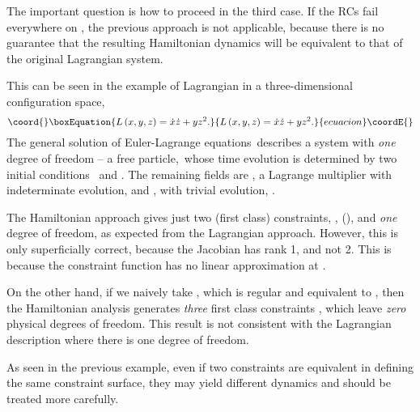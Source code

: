 \documentclass[a4paper,thmsa,11pt]{article}
\begin{document}
The important question is how to proceed in the third case. If the RCs fail
everywhere on \myHighlight{$\Sigma $}\coordHE{}, the previous approach is not applicable, because
there is no guarantee that the resulting Hamiltonian dynamics will be
equivalent to that of the original Lagrangian system.

This can be seen in the example of Lagrangian in a three-dimensional
configuration space,
\begin{equation}\coord{}\boxEquation{
L\left( x,y,z\right) =\dot{x}\dot{z}+yz^{2}.  \label{three particles}
}{
L\left( x,y,z\right) =\dot{x}\dot{z}+yz^{2}.  }{ecuacion}\coordE{}\end{equation}
The general solution of Euler-Lagrange equations\ describes a system with
\emph{one} degree of freedom -- a free particle,\ whose time evolution \coordHE{} is determined by two initial conditions \coordHE{}\ and \coordHE{}. The remaining fields are \coordHE{}, a Lagrange multiplier with
indeterminate evolution, and \coordHE{}, with trivial evolution, \coordHE{}.

The Hamiltonian approach gives just two (first class) constraints, \coordHE{},\coordHE{} (\coordHE{}), and \emph{one} degree of
freedom, as expected from the Lagrangian approach. However, this is only
superficially correct, because the Jacobian has rank 1, and not 2. This is
because the constraint function \myHighlight{$\phi =z^{2}$}\coordHE{} has no linear approximation at
\myHighlight{$z=0$}\coordHE{}.

On the other hand, if we naively take \coordHE{}, which is regular and
equivalent to \myHighlight{$z^{2}\approx 0$}\coordHE{}, then the Hamiltonian analysis generates
\emph{three} first class constraints \myHighlight{$p_{y}\approx 0,\;z\approx
0,\;p_{x}\approx 0$}\coordHE{}, which leave \emph{zero} physical degrees of freedom.
This result is not consistent with the Lagrangian description where there is
one degree of freedom.

As seen in the previous example, even if two constraints are equivalent in
defining the same constraint surface, they may yield different dynamics and
should be treated more carefully.
\end{document}
